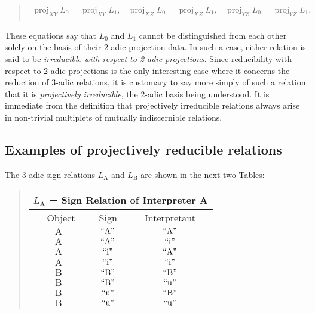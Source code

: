 \documentclass[12pt]{article}
\begin{document}
\begin{quote}$\begin{array}{lcr}
\operatorname{proj}_{XY}L_0 = \operatorname{proj}_{XY}L_1, &
\operatorname{proj}_{XZ}L_0 = \operatorname{proj}_{XZ}L_1, &
\operatorname{proj}_{YZ}L_0 = \operatorname{proj}_{YZ}L_1. \\
\end{array}$\end{quote}

These equations say that $L_0$ and $L_1$ cannot be distinguished from each other solely on the basis of their 2-adic projection data.  In such a case, either relation is said to be \textit{irreducible with respect to 2-adic projections}.  Since reducibility with respect to 2-adic projections is the only interesting case where it concerns the reduction of 3-adic relations, it is customary to say more simply of such a relation that it is \textit{projectively irreducible}, the 2-adic basis being understood.  It is immediate from the definition that projectively irreducible relations always arise in non-trivial multiplets of mutually indiscernible relations.

\subsection{Examples of projectively reducible relations}

The 3-adic sign relations $L_{\mathrm{A}}$ and $L_{\mathrm{B}}$ are shown in the next two Tables:

\begin{quote}\begin{tabular}{|c|c|c|}
\multicolumn{3}{c}{$L_{\mathrm{A}}$ = Sign Relation of Interpreter A} \\
\hline\
Object       & Sign            & Interpretant     \\
\hline\hline
$\mathrm{A}$ & $\mathrm{``A"}$ & $\mathrm{``A"}$  \\
\hline
$\mathrm{A}$ & $\mathrm{``A"}$ & $\mathrm{``i"}$  \\
\hline
$\mathrm{A}$ & $\mathrm{``i"}$ & $\mathrm{``A"}$  \\
\hline
$\mathrm{A}$ & $\mathrm{``i"}$ & $\mathrm{``i"}$  \\
\hline
$\mathrm{B}$ & $\mathrm{``B"}$ & $\mathrm{``B"}$  \\
\hline
$\mathrm{B}$ & $\mathrm{``B"}$ & $\mathrm{``u"}$  \\
\hline
$\mathrm{B}$ & $\mathrm{``u"}$ & $\mathrm{``B"}$  \\
\hline
$\mathrm{B}$ & $\mathrm{``u"}$ & $\mathrm{``u"}$  \\
\hline
\end{tabular}\end{quote}
\end{document}
